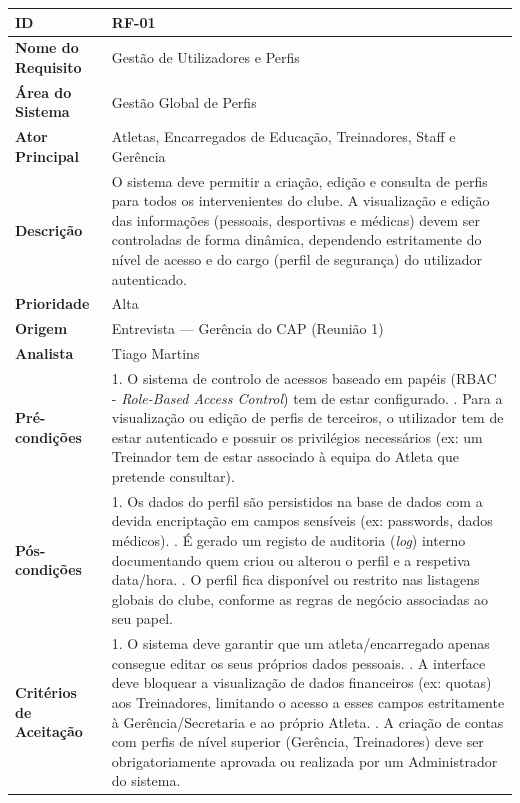 {\begin{xltabular}{\textwidth}{|l|X|}
\textbf{ID} & RF-01 \\ \hline
\textbf{Nome do Requisito} & Gestão de Utilizadores e Perfis \\ \hline
\textbf{Área do Sistema} & Gestão Global de Perfis \\ \hline
\textbf{Ator Principal} & Atletas, Encarregados de Educação, Treinadores, Staff e Gerência \\ \hline
\textbf{Descrição} & O sistema deve permitir a criação, edição e consulta de perfis para todos os intervenientes do clube. A visualização e edição das informações (pessoais, desportivas e médicas) devem ser controladas de forma dinâmica, dependendo estritamente do nível de acesso e do cargo (perfil de segurança) do utilizador autenticado. \\ \hline
\textbf{Prioridade} & Alta \\ \hline
\textbf{Origem} & Entrevista --- Gerência do CAP (Reunião 1) \\ \hline
\textbf{Analista} & Tiago Martins \\ \hline
\textbf{Pré-condições} & 1. O sistema de controlo de acessos baseado em papéis (RBAC - \textit{Role-Based Access Control}) tem de estar configurado. . Para a visualização ou edição de perfis de terceiros, o utilizador tem de estar autenticado e possuir os privilégios necessários (ex: um Treinador tem de estar associado à equipa do Atleta que pretende consultar). \\ \hline
\textbf{Pós-condições} & 1. Os dados do perfil são persistidos na base de dados com a devida encriptação em campos sensíveis (ex: passwords, dados médicos). . É gerado um registo de auditoria (\textit{log}) interno documentando quem criou ou alterou o perfil e a respetiva data/hora. . O perfil fica disponível ou restrito nas listagens globais do clube, conforme as regras de negócio associadas ao seu papel. \\ \hline
\textbf{Critérios de Aceitação} & 1. O sistema deve garantir que um atleta/encarregado apenas consegue editar os seus próprios dados pessoais. . A interface deve bloquear a visualização de dados financeiros (ex: quotas) aos Treinadores, limitando o acesso a esses campos estritamente à Gerência/Secretaria e ao próprio Atleta. . A criação de contas com perfis de nível superior (Gerência, Treinadores) deve ser obrigatoriamente aprovada ou realizada por um Administrador do sistema. \\
\end{xltabular}
}


